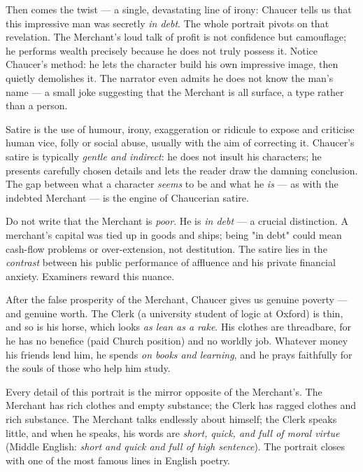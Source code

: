 \documentclass[11pt]{article}
\newcommand{\cle}[1]{{\popxbold\color{popdark}#1}}
\newcounter{popsec}
\newcounter{popsub}
\newcommand{\courssub}[1]{%
  \stepcounter{popsub}%
  \par\vspace{9pt}\noindent{\popxbold\fontsize{11.5}{13}\selectfont\color{popink}{\color{poporange}\thepopsec.\thepopsub}\hspace{6pt}#1}\par\nopagebreak\vspace{4pt}
}
\begin{document}
Then comes the twist — a single, devastating line of \cle{irony}: Chaucer tells us that this impressive man was secretly \emph{in debt}. The whole portrait pivots on that revelation. The Merchant's loud talk of profit is not confidence but camouflage; he performs wealth precisely because he does not truly possess it. Notice Chaucer's method: he lets the character build his own impressive image, then quietly demolishes it. The narrator even admits he does not know the man's name — a small joke suggesting that the Merchant is all surface, a type rather than a person.

\begin{definition}[Satire]
\cle{Satire} is the use of humour, irony, exaggeration or ridicule to expose and criticise human vice, folly or social abuse, usually with the aim of correcting it. Chaucer's satire is typically \emph{gentle and indirect}: he does not insult his characters; he presents carefully chosen details and lets the reader draw the damning conclusion. The gap between what a character \emph{seems} to be and what he \emph{is} — as with the indebted Merchant — is the engine of Chaucerian satire.
\end{definition}

\begin{attention}
Do not write that the Merchant is \emph{poor}. He is \emph{in debt} — a crucial distinction. A merchant's capital was tied up in goods and ships; being "in debt" could mean cash-flow problems or over-extension, not destitution. The satire lies in the \emph{contrast} between his public performance of affluence and his private financial anxiety. Examiners reward this nuance.
\end{attention}

\courssub{The Clerk of Oxford: The Ideal Scholar}

After the false prosperity of the Merchant, Chaucer gives us genuine poverty — and genuine worth. The \cle{Clerk} (a university student of logic at Oxford) is thin, and so is his horse, which looks \emph{as lean as a rake}. His clothes are threadbare, for he has no \cle{benefice} (paid Church position) and no worldly job. Whatever money his friends lend him, he spends \emph{on books and learning}, and he prays faithfully for the souls of those who help him study.

Every detail of this portrait is the mirror opposite of the Merchant's. The Merchant has rich clothes and empty substance; the Clerk has ragged clothes and rich substance. The Merchant talks endlessly about himself; the Clerk speaks little, and when he speaks, his words are \emph{short, quick, and full of moral virtue} (Middle English: \emph{short and quick and full of high sentence}). The portrait closes with one of the most famous lines in English poetry.
\end{document}
